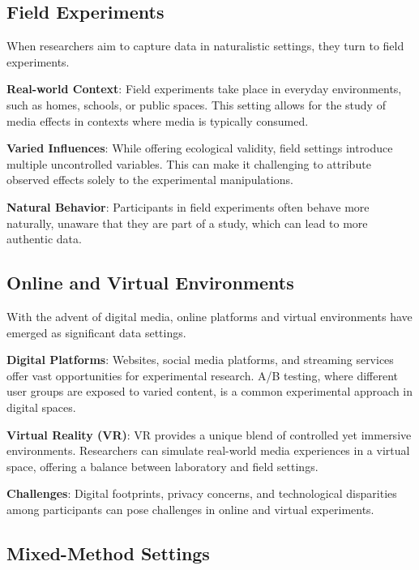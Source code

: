 \documentclass[
  b5paper]{book}
\begin{document}
\hypertarget{field-experiments}{%
\subsection*{Field Experiments}\label{field-experiments}}

When researchers aim to capture data in naturalistic settings, they turn to field experiments.

\textbf{Real-world Context}: Field experiments take place in everyday environments, such as homes, schools, or public spaces. This setting allows for the study of media effects in contexts where media is typically consumed.

\textbf{Varied Influences}: While offering ecological validity, field settings introduce multiple uncontrolled variables. This can make it challenging to attribute observed effects solely to the experimental manipulations.

\textbf{Natural Behavior}: Participants in field experiments often behave more naturally, unaware that they are part of a study, which can lead to more authentic data.

\hypertarget{online-and-virtual-environments}{%
\subsection*{Online and Virtual Environments}\label{online-and-virtual-environments}}

With the advent of digital media, online platforms and virtual environments have emerged as significant data settings.

\textbf{Digital Platforms}: Websites, social media platforms, and streaming services offer vast opportunities for experimental research. A/B testing, where different user groups are exposed to varied content, is a common experimental approach in digital spaces.

\textbf{Virtual Reality (VR)}: VR provides a unique blend of controlled yet immersive environments. Researchers can simulate real-world media experiences in a virtual space, offering a balance between laboratory and field settings.

\textbf{Challenges}: Digital footprints, privacy concerns, and technological disparities among participants can pose challenges in online and virtual experiments.

\hypertarget{mixed-method-settings}{%
\subsection*{Mixed-Method Settings}\label{mixed-method-settings}}
\end{document}
